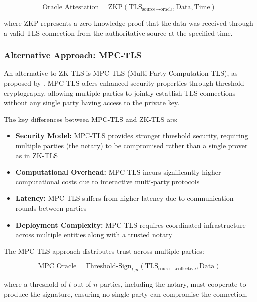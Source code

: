 \documentclass[12pt]{article}
\begin{document}
\begin{equation}
\text{Oracle Attestation} = \text{ZKP}(\text{TLS}_{\text{source} \rightarrow \text{oracle}}, \text{Data}, \text{Time})
\end{equation}

where ZKP represents a zero-knowledge proof that the data was received through a valid TLS connection from the authoritative source at the specified time.

\subsubsection{Alternative Approach: MPC-TLS}

An alternative to ZK-TLS is MPC-TLS (Multi-Party Computation TLS), as proposed by \cite{dagas2024mpctls}. MPC-TLS offers enhanced security properties through threshold cryptography, allowing multiple parties to jointly establish TLS connections without any single party having access to the private key.

The key differences between MPC-TLS and ZK-TLS are:

\begin{itemize}
  \item \textbf{Security Model:} MPC-TLS provides stronger threshold security, requiring multiple parties (the notary) to be compromised rather than a single prover as in ZK-TLS
  \item \textbf{Computational Overhead:} MPC-TLS incurs significantly higher computational costs due to interactive multi-party protocols
  \item \textbf{Latency:} MPC-TLS suffers from higher latency due to communication rounds between parties
  \item \textbf{Deployment Complexity:} MPC-TLS requires coordinated infrastructure across multiple entities along with a trusted notary
\end{itemize}

The MPC-TLS approach distributes trust across multiple parties:

\begin{equation}
\text{MPC Oracle} = \text{Threshold-Sign}_{t,n}(\text{TLS}_{\text{source} \rightarrow \text{collective}}, \text{Data})
\end{equation}

where a threshold of $t$ out of $n$ parties, including the notary, must cooperate to produce the signature, ensuring no single party can compromise the connection.
\end{document}
